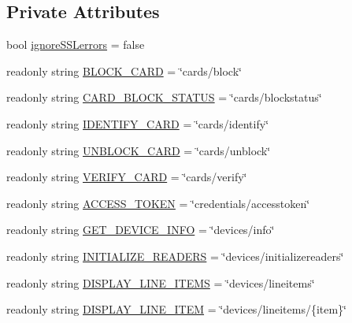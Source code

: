 \subsection*{Private Attributes}
\begin{DoxyCompactItemize}
\item 
bool \mbox{\hyperlink{class_form_sim_1_1_rest_handler_ae3f4dd32629759aba164eac64175c71f}{ignore\+S\+S\+Lerrors}} = false
\item 
readonly string \mbox{\hyperlink{class_form_sim_1_1_rest_handler_a6524f2a05b5c6bbe6b3755662f86fdab}{B\+L\+O\+C\+K\+\_\+\+C\+A\+RD}} = \char`\"{}cards/block\char`\"{}
\item 
readonly string \mbox{\hyperlink{class_form_sim_1_1_rest_handler_a4338bdac23d0558177bf5df5b3639e55}{C\+A\+R\+D\+\_\+\+B\+L\+O\+C\+K\+\_\+\+S\+T\+A\+T\+US}} = \char`\"{}cards/blockstatus\char`\"{}
\item 
readonly string \mbox{\hyperlink{class_form_sim_1_1_rest_handler_a4c4b833300f1760e624cb25aedcb0cd7}{I\+D\+E\+N\+T\+I\+F\+Y\+\_\+\+C\+A\+RD}} = \char`\"{}cards/identify\char`\"{}
\item 
readonly string \mbox{\hyperlink{class_form_sim_1_1_rest_handler_a7a93675f32f8a682458f8e2d6fdf9384}{U\+N\+B\+L\+O\+C\+K\+\_\+\+C\+A\+RD}} = \char`\"{}cards/unblock\char`\"{}
\item 
readonly string \mbox{\hyperlink{class_form_sim_1_1_rest_handler_adbde7c45aab3b4a97cf1464065161dcd}{V\+E\+R\+I\+F\+Y\+\_\+\+C\+A\+RD}} = \char`\"{}cards/verify\char`\"{}
\item 
readonly string \mbox{\hyperlink{class_form_sim_1_1_rest_handler_a662385f69d094beb118184cc00d0be00}{A\+C\+C\+E\+S\+S\+\_\+\+T\+O\+K\+EN}} = \char`\"{}credentials/accesstoken\char`\"{}
\item 
readonly string \mbox{\hyperlink{class_form_sim_1_1_rest_handler_a78b7d4fdea5fe30c1f82dbe17ea2e093}{G\+E\+T\+\_\+\+D\+E\+V\+I\+C\+E\+\_\+\+I\+N\+FO}} = \char`\"{}devices/info\char`\"{}
\item 
readonly string \mbox{\hyperlink{class_form_sim_1_1_rest_handler_ad55f11f47492affe120d64685d11356f}{I\+N\+I\+T\+I\+A\+L\+I\+Z\+E\+\_\+\+R\+E\+A\+D\+E\+RS}} = \char`\"{}devices/initializereaders\char`\"{}
\item 
readonly string \mbox{\hyperlink{class_form_sim_1_1_rest_handler_a205748c1af29fb6e639c7e6ad4b78bf2}{D\+I\+S\+P\+L\+A\+Y\+\_\+\+L\+I\+N\+E\+\_\+\+I\+T\+E\+MS}} = \char`\"{}devices/lineitems\char`\"{}
\item 
readonly string \mbox{\hyperlink{class_form_sim_1_1_rest_handler_a0ed7785fca279bdb9dd7e600f71553c0}{D\+I\+S\+P\+L\+A\+Y\+\_\+\+L\+I\+N\+E\+\_\+\+I\+T\+EM}} = \char`\"{}devices/lineitems/\{item\}\char`\"{}

\end{DoxyCompactItemize}
